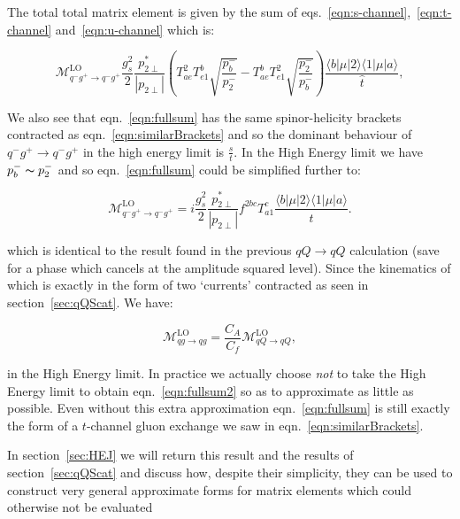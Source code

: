 		The total total matrix element is given by the sum of eqs.~\eqref{eqn:s-channel},~\eqref{eqn:t-channel} and~\eqref{eqn:u-channel} which is:

		\begin{equation}
			\mathcal{M}_{q^-g^+\to q^-g^+}^{\text{LO}}
			\frac{g_s^2}{2}\frac{p_{2\perp}^*}{|p_{2\perp}|}\left(T^2_{ae}T^b_{e1}\sqrt{\frac{p_b^-}{p_2^-}}-T^b_{ae}T^2_{e1}
			\sqrt{\frac{p_2^-}{p_b^-}}\right)\frac{\langle{b}|\mu|2\rangle\langle{1}|\mu|a\rangle}{\hat{t}},
			\label{eqn:fullsum}
		\end{equation}

		We also see that eqn.~\eqref{eqn:fullsum} has the same spinor-helicity brackets contracted as eqn.~\eqref{eqn:similarBrackets}
		and so the dominant behaviour of $q^-g^+\to q^-g^+$ in the high energy limit is $\frac{s}{t}$.
		In the High Energy limit we have $p_b^-\thicksim p_2^-$ and so eqn.~\eqref{eqn:fullsum} could be simplified
		further to:

		\begin{equation}
			\mathcal{M}_{q^-g^+\to q^-g^+}^{\text{LO}}=i\frac{g_s^2}{2}\frac{p_{2\perp}^*}{|p_{2\perp}|}f^{2bc}T^c_{a1}
			\frac{\langle{b}|\mu|2\rangle\langle{1}|\mu|a\rangle}{\hat{t}}.
			\label{eqn:fullsum2}
		\end{equation}

		which is identical to the result found in the previous $qQ\rightarrow qQ$ calculation (save for a phase which cancels
		at the amplitude squared level). Since the kinematics of which is exactly in the form of two `currents' contracted as
		seen in section~\ref{sec:qQScat}.  We have:

		\begin{equation}
			\mathcal{M}_{qg\to qg}^{\text{LO}} = \frac{C_A}{C_f} \mathcal{M}_{qQ\to qQ}^{\text{LO}},
		\end{equation}

		in the High Energy limit. In practice we actually choose \emph{not} to take the High Energy limit to obtain
		eqn.~\eqref{eqn:fullsum2} so as to approximate as little as possible.  Even without this extra approximation
		eqn.~\eqref{eqn:fullsum} is still exactly the form of a $t$-channel gluon exchange we saw in
		eqn.~\eqref{eqn:similarBrackets}.

		In section~\ref{sec:HEJ} we will return this result and the results of section~\ref{sec:qQScat} and discuss how,
		despite their simplicity, they can be used to construct very general approximate forms for matrix elements which
		could otherwise not be evaluated

